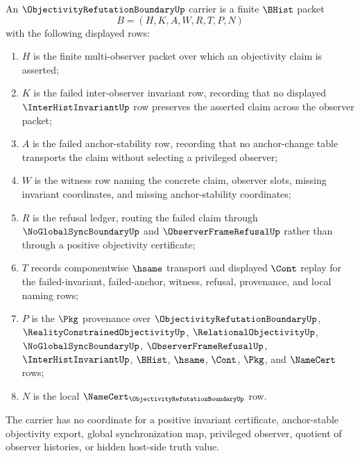 \begin{definition}
\label{def:objectivity-refutation-boundary-carrier}
An $\ObjectivityRefutationBoundaryUp$ carrier is a finite $\BHist$ packet
$$
B=(H,K,A,W,R,T,P,N)
$$
with the following displayed rows:
\begin{enumerate}
\item $H$ is the finite multi-observer packet over which an objectivity claim is asserted;
\item $K$ is the failed inter-observer invariant row, recording that no displayed $\InterHistInvariantUp$ row preserves the asserted claim across the observer packet;
\item $A$ is the failed anchor-stability row, recording that no anchor-change table transports the claim without selecting a privileged observer;
\item $W$ is the witness row naming the concrete claim, observer slots, missing invariant coordinates, and missing anchor-stability coordinates;
\item $R$ is the refusal ledger, routing the failed claim through $\NoGlobalSyncBoundaryUp$ and $\ObserverFrameRefusalUp$ rather than through a positive objectivity certificate;
\item $T$ records componentwise $\hsame$ transport and displayed $\Cont$ replay for the failed-invariant, failed-anchor, witness, refusal, provenance, and local naming rows;
\item $P$ is the $\Pkg$ provenance over $\ObjectivityRefutationBoundaryUp$, $\RealityConstrainedObjectivityUp$, $\RelationalObjectivityUp$, $\NoGlobalSyncBoundaryUp$, $\ObserverFrameRefusalUp$, $\InterHistInvariantUp$, $\BHist$, $\hsame$, $\Cont$, $\Pkg$, and $\NameCert$ rows;
\item $N$ is the local $\NameCert_{\ObjectivityRefutationBoundaryUp}$ row.
\end{enumerate}
The carrier has no coordinate for a positive invariant certificate, anchor-stable objectivity export, global synchronization map, privileged observer, quotient of observer histories, or hidden host-side truth value.
\end{definition}

